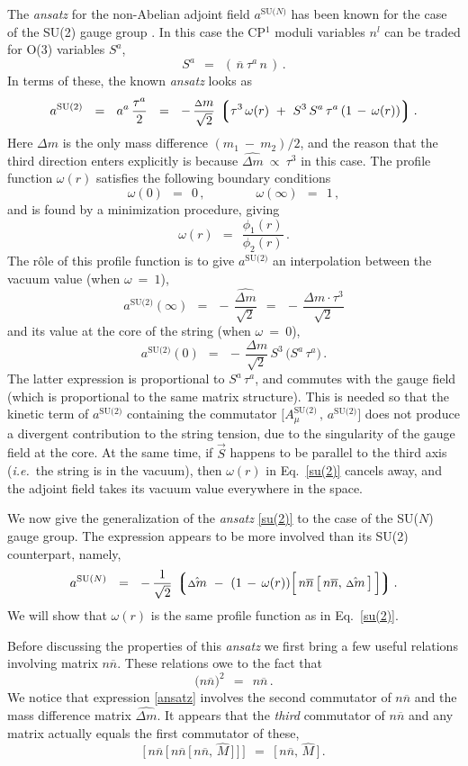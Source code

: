 \documentclass[12pt]{article}
\def\beq{\begin{equation}}
\def\eeq{\end{equation}}
\newcommand{\ov}{\overline}
\newcommand{\lgr}{\left\lgroup}
\newcommand{\rgr}{\right\rgroup}
\newcommand{\aN}{a^\text{SU($N$)}}
\newcommand{\nbar}{\ov{n}}
\newcommand{\nnbar}{n\ov{n}}
\newcommand{\dm}{\hat{{\scriptstyle \Delta} m}}
\newcommand{\deltam}{{\scriptstyle \Delta} m}
\newcommand{\ie}{{\it i.e.}~}
\newcommand{\ansatz}{{\it ansatz} }
\begin{document}
	The \ansatz for the non-Abelian adjoint field $ \aN $ has been known for the case
	of the SU(2) gauge group \cite{SYmon}.
	In this case the CP$^1$ moduli variables $ n^l $ can be traded for O(3) variables $ S^a $,
\beq
\label{S}
	S^a    ~~=~~    (\, \nbar\: \tau^a\, n \,)\,.
\eeq
	In terms of these, the known \ansatz looks as
\beq
\label{su(2)}
	a^\text{SU(2)}    ~~=~~
	a^a\, \frac{\tau^a}{2}    ~~=~~    -\, \frac{\deltam}{\sqrt{2}}\, 
		\lgr  \tau^3\, \omega(r)  ~+~  S^3\, S^a\,\tau^a\, (1 \,-\, \omega(r))  \rgr.
\eeq
	Here $ \deltam $ is the only mass difference $ (m_1 ~-~ m_2)/2 $, and the reason
	that the third direction enters explicitly is because $ \dm ~\propto~ \tau^3 $ in this case.
	The profile function $ \omega(r) $ satisfies the following boundary conditions
\beq
	\omega(0)    ~~=~~    0\,,
	\qquad\qquad
	\omega(\infty)    ~~=~~    1\,,
\eeq
	and is found by a minimization procedure, giving
\beq
	\omega(r)    ~~=~~    \frac{\phi_1(r)}{\phi_2(r)}\,.
\eeq
	The r\^ole of this profile function is to give $ a^\text{SU(2)} $ an interpolation
	between the vacuum value (when $ \omega ~=~ 1 $),
\beq
	a^\text{SU(2)}(\infty)    ~~=~~    -\, \frac{\dm}{\sqrt{2}}    ~~=~~    -\, \frac{\deltam \cdot \tau^3}{\sqrt{2}}
\eeq
	and its value at the core of the string (when $ \omega ~=~ 0 $),
\beq
	a^\text{SU(2)}(0)    ~~=~~    -\, \frac{\deltam}{\sqrt{2}}\, S^3\, \big( S^a\, \tau^a \big)\,.
\eeq
	The latter expression is proportional to $ S^a\, \tau^a $, and commutes with the gauge field
	(which is proportional to the same matrix structure).
	This is needed so that the kinetic term of $ a^\text{SU(2)} $ containing the
	commutator $ \Big[ A^\text{SU(2)}_\mu \,,\, a^\text{SU(2)} \Big] $ does not produce 
	a divergent contribution to the string tension, due to the singularity of the gauge field at the core.
	At the same time, if $ \vec{S} $ happens to be parallel to the third axis (\ie the string is in the vacuum),
	then $ \omega(r) $ in Eq.~\eqref{su(2)} cancels away, and the adjoint field takes its vacuum value everywhere in the space.

	We now give the generalization of the \ansatz \eqref{su(2)} to the case
	of the SU($N$) gauge group.
	The expression appears to be more involved than its SU(2) counterpart, namely,
\beq
\label{ansatz}
	\aN    ~~=~~    
	-\, \frac{1}{\sqrt{2}}\, 
	\lgr \dm  ~-~  (1 \,-\, \omega(r)) \Big[\, \nnbar\, \big[\, \nnbar,\, \dm \,\big] \,\Big] \rgr.
\eeq
	We will show that $ \omega(r) $ is the same profile function as in Eq.~\eqref{su(2)}.

	Before discussing the properties of this \ansatz we first bring a few useful relations
	involving matrix $ \nnbar $.
	These relations owe to the fact that 
\beq
\label{nnbarsq}
	\big( \nnbar \big)^2 ~~=~~ \nnbar\,.
\eeq
	We notice that expression \eqref{ansatz} involves the second commutator of $ \nnbar $
	and the mass difference matrix $ \dm $.
	It appears that the \emph{third} commutator of $ \nnbar $ and any matrix actually
	equals the first commutator of these,
\beq
\label{comm}
	\Big[\, \nnbar\, \Big[\, \nnbar\, \big[\, \nnbar,\, \hat{M} \,\big] \,\Big] \,\Big]    ~~=~~
	\big[\, \nnbar,\, \hat{M} \,\big]\,.
\eeq
\end{document}
